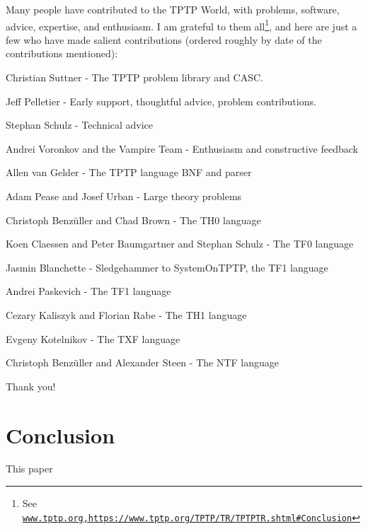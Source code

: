 \documentclass{easychair}
\newenvironment{packed_itemize}{
\vspace*{-0.2em}
\begin{itemize}
\setlength{\partopsep}{0pt}
\setlength{\itemsep}{1pt}
\setlength{\parskip}{0pt}
\setlength{\parsep}{0pt}
}{\end{itemize}}
\begin{document}
Many people have contributed to the TPTP World, with problems, software, advice, expertise,
and enthusiasm. 
I am grateful to them all\footnote{%
See \href{http://www.tptp.org,https://www.tptp.org/TPTP/TR/TPTPTR.shtml\#Conclusion}{{\tt www.tptp.org,https://www.tptp.org/TPTP/TR/TPTPTR.shtml\#Conclusion}}}, 
and here are just a few who have made salient contributions (ordered roughly by date of the 
contributions mentioned):
\begin{packed_itemize}
\item Christian Suttner - The TPTP problem library and CASC.                 %
\item Jeff Pelletier - Early support, thoughtful advice, problem contributions. %
\item Stephan Schulz - Technical advice                                      %
\item Andrei Voronkov and the Vampire Team - Enthusiasm and constructive feedback  %
\item Allen van Gelder - The TPTP language BNF and parser                    %
\item Adam Pease and Josef Urban - Large theory problems                     %
\item Christoph Benz{\"u}ller and Chad Brown - The TH0 language              %
\item Koen Claessen and Peter Baumgartner and Stephan Schulz - The TF0 language %
\item Jasmin Blanchette - Sledgehammer to SystemOnTPTP, the TF1 language     %
\item Andrei Paskevich - The TF1 language                                    %
\item Cezary Kaliszyk and Florian Rabe - The TH1 language                    %
\item Evgeny Kotelnikov - The TXF language                                   %
\item Christoph Benz{\"u}ller and Alexander Steen - The NTF language         %
\end{packed_itemize}
Thank you!

\section{Conclusion}
\label{Conclusion}

This paper 
\end{document}
